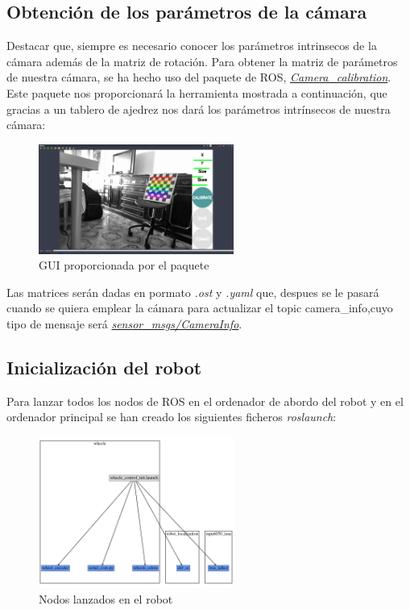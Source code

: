 \subsection{Obtención de los parámetros de la cámara}
Destacar que, siempre es necesario conocer los parámetros intrinsecos de la cámara además de la matriz de rotación. Para obtener la matriz de parámetros de nuestra cámara, se ha hecho uso del paquete de ROS, \textit{\href{http://wiki.ros.org/camera_calibration}{Camera\_calibration}}.\\
Este paquete nos proporcionará la herramienta mostrada a continuación, que gracias a un tablero de ajedrez nos dará los parámetros intrínsecos de nuestra cámara:
\begin{figure}[!ht]
    \centering
    \includegraphics[width=0.57\textwidth]{images/calibration_art}
    \caption{GUI proporcionada por el paquete}
\end{figure}

Las matrices serán dadas en pormato \textit{.ost} y \textit{.yaml} que, despues se le pasará cuando se quiera emplear la cámara para actualizar el topic camera\_info,cuyo 
tipo de mensaje será \textit{\href{http://docs.ros.org/melodic/api/sensor_msgs/html/msg/CameraInfo.html}{sensor\_msgs/CameraInfo}}.
\subsection{Inicialización del robot}
Para lanzar todos los nodos de ROS en el ordenador de abordo del robot y en el ordenador principal se han creado los siguientes ficheros \textit{roslaunch}:
    \begin{figure}[!ht]
        \centering
        \includegraphics[width=0.57\textwidth]{images/whee}
        \caption{Nodos lanzados en el robot}
    \end{figure}

